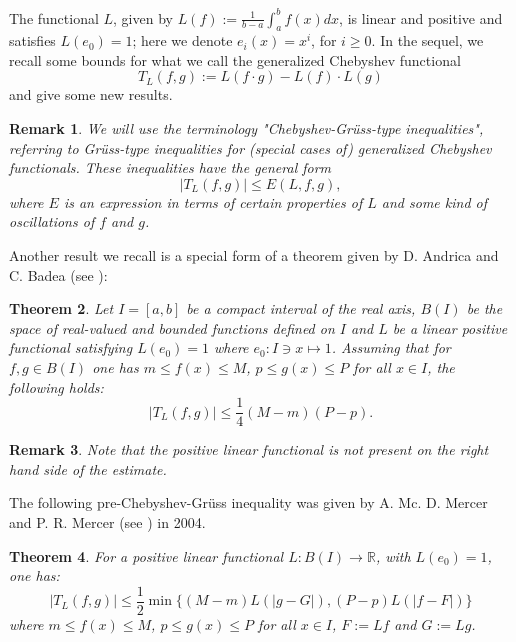 \documentclass[12pt,leqno,a4paper,dvips,twoside]{article}
\newcommand*{\R}{\ensuremath{\mathbb{R}}}               %
\newtheorem{thm}{Theorem}[section]
\newtheorem{rema}[thm]{Remark}%
\begin{document}
{The functional $L$, given by $L(f):=\frac{1}{b-a}\int^{b}_{a}{f(x)dx}$, is linear and positive and satisfies $L(e_0)=1$; here we denote $e_i(x)=x^i$, for $i\geq 0$. In the sequel, we recall some bounds for what we call the generalized Chebyshev functional
	\begin{equation}\label{gcf}
		T_L(f,g):=L(f\cdot g)-L(f)\cdot L(g)
	\end{equation}
and give some new results.

\begin{rema}
	We will use the terminology "Chebyshev-Gr\"{u}ss-type inequalities", referring to Gr\"{u}ss-type inequalities for (special cases of) generalized Chebyshev functionals. These inequalities have the general form
		\begin{equation*}	
			\left|T_L(f,g)\right|\leq E(L,f,g),
		\end{equation*}  
	where $E$ is an expression in terms of certain properties of $L$ and some kind of oscillations of $f$ and $g$.
\end{rema} 

Another result we recall is a special form of a theorem given by D. Andrica and C. Badea (see \cite{andrica:1988}):
	\begin{thm}
Let $I=[a,b]$ be a compact interval of the real axis, $B(I)$ be the space of real-valued and bounded
functions defined on $I$ and $L$ be a linear positive functional satisfying $L(e_0)=1$ where $e_0:I\ni x \mapsto 1$. Assuming that for $f,g\in B(I)$ one has $m\leq f(x)\leq M$, $p\leq g(x)\leq P$ for all
$x\in I$, the following holds:
	\begin{equation*}
		\left|T_L(f,g)\right| \leq \frac{1}{4}(M-m)(P-p).
	\end{equation*}
\end{thm}

\begin{rema}
	Note that the positive linear functional is not present on the right hand side of the estimate. 
\end{rema}

The following pre-Chebyshev-Gr\"{u}ss inequality was given by A. Mc. D. Mercer and P. R. Mercer (see \cite{mercer:2004}) in 2004.

\begin{thm}
	For a positive linear functional $L:B(I)\to \R$, with $L(e_0)=1$, one has:
		\begin{equation*}
	\left| T_L(f,g)\right|
		\leq \frac{1}{2}\min\{(M-m) L\left(\left|g-G\right|\right),
			(P-p)L\left(\left|f-F\right|\right)\}
		\end{equation*}	
	where $m\leq f(x)\leq M$, $p\leq g(x)\leq P$ for all $x\in I$, $F:=Lf$ and $G:=Lg$.  
\end{thm}

}
\end{document}
